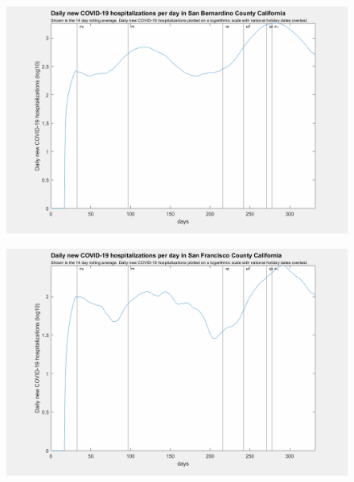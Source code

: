 \documentclass[]{article}
\begin{document}
\begin{figure}[!h]
	\includegraphics[width=\linewidth]{images/san_bernardino_hospitalizations_holiday_log.png}
	\caption{}
	\label{fig:images/san_bernardino_hospitalizations_holiday_logLabel}
\end{figure}

\begin{figure}[!h]
	\includegraphics[width=\linewidth]{images/san_francisco_hospitalizations_holiday_log.png}
	\caption{}
	\label{fig:images/san_francisco_hospitalizations_holiday_logLabel}
\end{figure}
\end{document}
